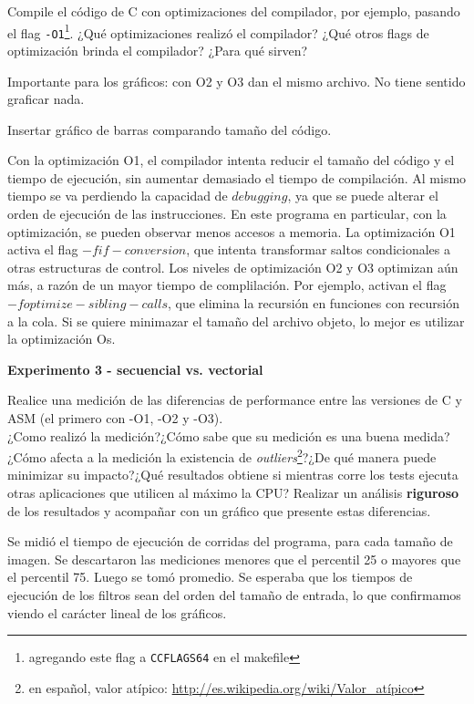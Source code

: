 Compile el código de C con optimizaciones del compilador, por ejemplo, pasando el flag \verb|-O1|\footnote{agregando este flag a \texttt{CCFLAGS64} en el makefile}. 
¿Qué optimizaciones realizó el compilador?
¿Qué otros flags de optimización brinda el compilador?
¿Para qué sirven?

\hruler

Importante para los gráficos: con O2 y O3 dan el mismo archivo. No tiene sentido graficar nada.

Insertar gráfico de barras comparando tamaño del código.


Con la optimización O1, el compilador intenta reducir el tamaño del código y el tiempo de ejecución, sin aumentar demasiado el tiempo de
compilación. Al mismo tiempo se va perdiendo la capacidad de $debugging$, ya que se puede alterar el orden de ejecución de las instrucciones.
En este programa en particular, con la optimización, se pueden observar menos accesos a memoria. La optimización O1 activa el flag 
$-fif-conversion$, que intenta transformar saltos condicionales a otras estructuras de control.
Los niveles de optimización O2 y O3 optimizan aún más, a razón de un mayor tiempo de complilación. Por ejemplo, activan el flag $-foptimize-sibling-calls$,
que elimina la recursión en funciones con recursión a la cola. Si se quiere minimazar el tamaño del archivo objeto, lo mejor es utilizar la
optimización Os.

\vspace*{0.3cm} \noindent
\textbf{Experimento 3 - secuencial vs. vectorial}

	Realice una medición de las diferencias de performance entre las versiones
	de C y ASM (el primero con -O1, -O2 y -O3).\\
	¿Como realizó la medición?¿Cómo sabe que su medición es una buena medida?¿Cómo afecta a la medición la existencia de \emph{outliers}\footnote{en español, valor atípico: \url{http://es.wikipedia.org/wiki/Valor_atípico}}?¿De qué manera puede minimizar su impacto?¿Qué resultados obtiene si mientras corre los tests ejecuta otras aplicaciones que utilicen al máximo la CPU? 
	Realizar un análisis \textbf{riguroso} de los resultados y acompañar con un gráfico que presente estas diferencias.

\hruler

Se midió el tiempo de ejecución de  corridas del programa, para cada tamaño de imagen. Se descartaron las mediciones menores que el
percentil 25 o mayores que el percentil 75. Luego se tomó promedio. Se esperaba que los tiempos de ejecución de los filtros sean del orden del
tamaño de entrada, lo que confirmamos viendo el carácter lineal de los gráficos.

